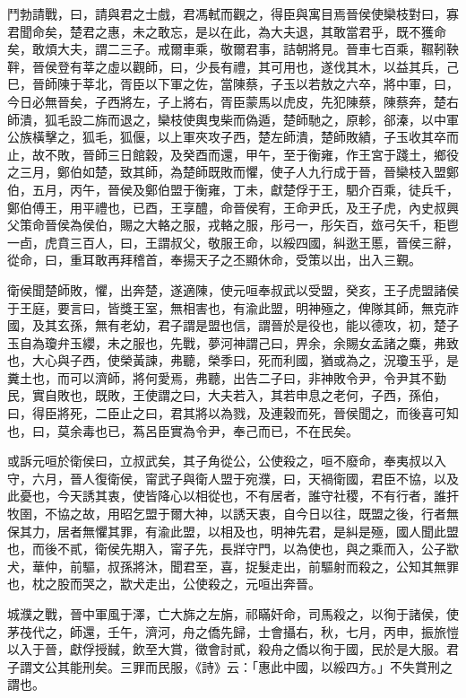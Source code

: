 \begin{pinyinscope}
鬥勃請戰，曰，請與君之士戲，君馮軾而觀之，得臣與寓目焉晉侯使欒枝對曰，寡君聞命矣，楚君之惠，未之敢忘，是以在此，為大夫退，其敢當君乎，既不獲命矣，敢煩大夫，謂二三子。戒爾車乘，敬爾君事，詰朝將見。晉車七百乘，韅靷鞅靽，晉侯登有莘之虛以觀師，曰，少長有禮，其可用也，遂伐其木，以益其兵，己巳，晉師陳于莘北，胥臣以下軍之佐，當陳蔡，子玉以若敖之六卒，將中軍，曰，今日必無晉矣，子西將左，子上將右，胥臣蒙馬以虎皮，先犯陳蔡，陳蔡奔，楚右師潰，狐毛設二旆而退之，欒枝使輿曳柴而偽遁，楚師馳之，原軫，郤溱，以中軍公族橫擊之，狐毛，狐偃，以上軍夾攻子西，楚左師潰，楚師敗績，子玉收其卒而止，故不敗，晉師三日館穀，及癸酉而還，甲午，至于衡雍，作王宮于踐土，鄉役之三月，鄭伯如楚，致其師，為楚師既敗而懼，使子人九行成于晉，晉欒枝入盟鄭伯，五月，丙午，晉侯及鄭伯盟于衡雍，丁未，獻楚俘于王，駟介百乘，徒兵千，鄭伯傅王，用平禮也，已酉，王享醴，命晉侯宥，王命尹氏，及王子虎，內史叔興父策命晉侯為侯伯，賜之大輅之服，戎輅之服，彤弓一，彤矢百，玈弓矢千，秬鬯一卣，虎賁三百人，曰，王謂叔父，敬服王命，以綏四國，糾逖王慝，晉侯三辭，從命，曰，重耳敢再拜稽首，奉揚天子之丕顯休命，受策以出，出入三覲。

衛侯聞楚師敗，懼，出奔楚，遂適陳，使元咺奉叔武以受盟，癸亥，王子虎盟諸侯于王庭，要言曰，皆獎王室，無相害也，有渝此盟，明神殛之，俾隊其師，無克祚國，及其玄孫，無有老幼，君子謂是盟也信，謂晉於是役也，能以德攻，初，楚子玉自為瓊弁玉纓，未之服也，先戰，夢河神謂己曰，畀余，余賜女孟諸之麋，弗致也，大心與子西，使榮黃諫，弗聽，榮季曰，死而利國，猶或為之，況瓊玉乎，是糞土也，而可以濟師，將何愛焉，弗聽，出告二子曰，非神敗令尹，令尹其不勤民，實自敗也，既敗，王使謂之曰，大夫若入，其若申息之老何，子西，孫伯，曰，得臣將死，二臣止之曰，君其將以為戮，及連穀而死，晉侯聞之，而後喜可知也，曰，莫余毒也已，蒍呂臣實為令尹，奉己而已，不在民矣。

或訴元咺於衛侯曰，立叔武矣，其子角從公，公使殺之，咺不廢命，奉夷叔以入守，六月，晉人復衛侯，甯武子與衛人盟于宛濮，曰，天禍衛國，君臣不協，以及此憂也，今天誘其衷，使皆降心以相從也，不有居者，誰守社稷，不有行者，誰扞牧圉，不協之故，用昭乞盟于爾大神，以誘天衷，自今日以往，既盟之後，行者無保其力，居者無懼其罪，有渝此盟，以相及也，明神先君，是糾是殛，國人聞此盟也，而後不貳，衛侯先期入，甯子先，長牂守門，以為使也，與之乘而入，公子歂犬，華仲，前驅，叔孫將沐，聞君至，喜，捉髮走出，前驅射而殺之，公知其無罪也，枕之股而哭之，歂犬走出，公使殺之，元咺出奔晉。

城濮之戰，晉中軍風于澤，亡大旆之左旃，祁瞞奸命，司馬殺之，以徇于諸侯，使茅茷代之，師還，壬午，濟河，舟之僑先歸，士會攝右，秋，七月，丙申，振旅愷以入于晉，獻俘授馘，飲至大賞，徵會討貳，殺舟之僑以徇于國，民於是大服。君子謂文公其能刑矣。三罪而民服，《詩》云：「惠此中國，以綏四方。」不失賞刑之謂也。


\end{pinyinscope}
